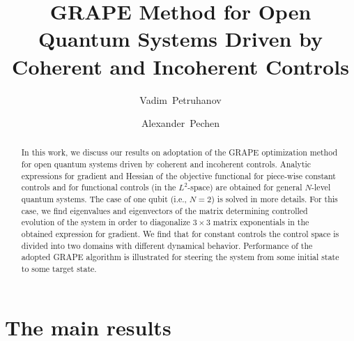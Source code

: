 \documentclass[12pt]{llncs}
\begin{document}
%
\fi

\title{GRAPE Method for Open Quantum Systems Driven by Coherent and Incoherent Controls}
\author{Vadim~Petruhanov
  \and
 Alexander~Pechen
}

\maketitle

\begin{abstract}
In this work, we discuss our results on adoptation of the GRAPE optimization method for open quantum systems driven by coherent and incoherent controls. Analytic expressions for gradient and Hessian of the objective functional for piece-wise constant controls and for functional controls (in the $L^2$-space) are obtained for general $N$-level quantum systems. The case of one qubit (i.e., $N=2$) is solved in more details. For this case, we find eigenvalues and eigenvectors of the matrix determining controlled evolution of the system in order to diagonalize $3\times3$  matrix exponentials in the obtained expression for gradient. We find that for  constant controls the control space is divided into two domains with different dynamical behavior. Performance of the adopted GRAPE algorithm is illustrated for steering the system from some initial state to some target state. 

\end{abstract}

\section{The main results}
\end{document}

